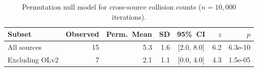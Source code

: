 \begin{table}[t]
\centering
\caption{Permutation null model for cross-source collision counts ($n = 10{,}000$ iterations).}
\label{tab:permutation_null}
\begin{tabular}{lrrrcrr}
\toprule
Subset & Observed & Perm.\ Mean & SD & 95\%\ CI & $z$ & $p$ \\
\midrule
All sources & 15 & 5.3 & 1.6 & [2.0, 8.0] & 6.2 & 6.3e-10 \\
Excluding OLv2 & 7 & 2.1 & 1.1 & [0.0, 4.0] & 4.3 & 1.5e-05 \\
\bottomrule
\end{tabular}
\end{table}